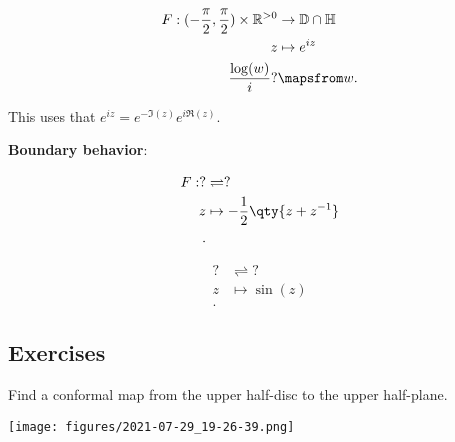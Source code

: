 \begin{proposition}

\begin{align*}
F: (-{\pi\over 2}, {\pi \over 2}) \times{\mathbb{R}}^{>0} &\to {\mathbb{D}}\cap{\mathbb{H}}\\
z &\mapsto e^{iz} \\
{\log(w) \over i}? &\mapsfrom w
.\end{align*}

This uses that \(e^{iz} = e^{-\Im(z)} e^{i \Re(z)}\).

\textbf{Boundary behavior}:

\end{proposition}

\begin{proposition}

\begin{align*}
F: ? &\rightleftharpoons? \\
z & \mapsto -{1\over 2}\qty{z + z^{-1}} \\
.\end{align*}

\end{proposition}

\begin{proposition}

\begin{align*}
? &\rightleftharpoons? \\
z &\mapsto \sin(z) \\
.\end{align*}

\end{proposition}

\hypertarget{exercises-4}{%
\subsection{Exercises}\label{exercises-4}}

\begin{exercise}[?]

Find a conformal map from the upper half-disc to the upper half-plane.

\end{exercise}

\begin{solution}

\texttt{[image: figures/2021-07-29\_19-26-39.png]}

\end{solution}

